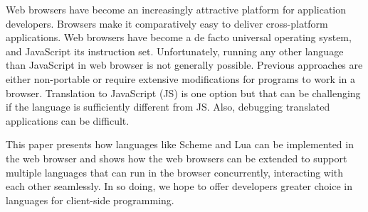 Web browsers have become an increasingly attractive platform for application developers. Browsers make it comparatively easy to deliver cross-platform applications. Web browsers have become a de facto universal operating system, and JavaScript its instruction set. Unfortunately, running any other language than JavaScript in web browser is not generally possible. Previous approaches are either non-portable or require extensive modifications for programs to work in a browser. Translation to JavaScript (JS) is one option but that can be challenging if the language is sufficiently different from JS. Also, debugging translated applications can be difficult.

This paper presents how languages like Scheme and Lua can be implemented in the web browser and shows how the web browsers can be extended to support multiple languages that can run in the browser concurrently, interacting with each other seamlessly. In so doing, we hope to offer developers greater choice in languages for client-side programming.

